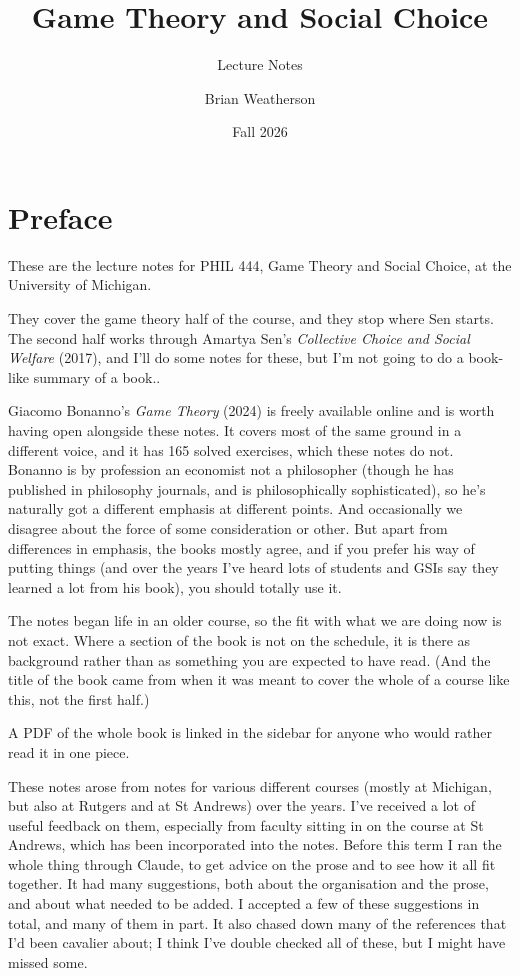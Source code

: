 \documentclass[
  11pt,
  letterpaper,
]{scrbook}
\title{Game Theory and Social Choice}
\subtitle{Lecture Notes}
\author{Brian Weatherson}
\date{Fall 2026}
\renewcommand*\contentsname{Table of contents}
\newcommand\contentsname{Table of contents}
\begin{document}
\frontmatter
\maketitle

\renewcommand*\contentsname{Table of contents}
{
\setcounter{tocdepth}{2}
\tableofcontents
}

\mainmatter
{}

\chapter*{Preface}\label{preface}


These are the lecture notes for PHIL 444, Game Theory and Social Choice,
at the University of Michigan.

They cover the game theory half of the course, and they stop where Sen
starts. The second half works through Amartya Sen's \emph{Collective
Choice and Social Welfare} (2017), and I'll do some notes for these, but
I'm not going to do a book-like summary of a book..

Giacomo Bonanno's \emph{Game Theory} (2024) is freely available online
and is worth having open alongside these notes. It covers most of the
same ground in a different voice, and it has 165 solved exercises, which
these notes do not. Bonanno is by profession an economist not a
philosopher (though he has published in philosophy journals, and is
philosophically sophisticated), so he's naturally got a different
emphasis at different points. And occasionally we disagree about the
force of some consideration or other. But apart from differences in
emphasis, the books mostly agree, and if you prefer his way of putting
things (and over the years I've heard lots of students and GSIs say they
learned a lot from his book), you should totally use it.

The notes began life in an older course, so the fit with what we are
doing now is not exact. Where a section of the book is not on the
schedule, it is there as background rather than as something you are
expected to have read. (And the title of the book came from when it was
meant to cover the whole of a course like this, not the first half.)

A PDF of the whole book is linked in the sidebar for anyone who would
rather read it in one piece.

These notes arose from notes for various different courses (mostly at
Michigan, but also at Rutgers and at St Andrews) over the years. I've
received a lot of useful feedback on them, especially from faculty
sitting in on the course at St Andrews, which has been incorporated into
the notes. Before this term I ran the whole thing through Claude, to get
advice on the prose and to see how it all fit together. It had many
suggestions, both about the organisation and the prose, and about what
needed to be added. I accepted a few of these suggestions in total, and
many of them in part. It also chased down many of the references that
I'd been cavalier about; I think I've double checked all of these, but I
might have missed some.
\end{document}
